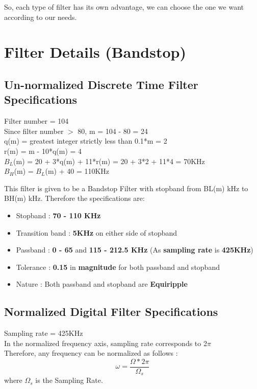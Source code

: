 \documentclass{article}
\begin{document}
So, each type of filter has its own advantage, we can choose the one we want according to our needs.

\clearpage

\section{Filter Details (Bandstop)}
\subsection{Un-normalized Discrete Time Filter Specifications}

Filter number = 104\\
Since filter number $>$ 80, m = 104 - 80 = 24\\
q(m) = greatest integer strictly less than 0.1*m = 2\\
r(m) = m - 10*q(m) = 4\\
$B_L$(m) = 20 + 3*q(m) + 11*r(m) = 20 + 3*2 + 11*4 = 70KHz \\
$B_H$(m) = $B_L$(m) + 40 = 110KHz\\

\vspace{1.5em}
\noindent

This filter is given to be a Bandstop Filter with stopband from BL(m) kHz to BH(m) kHz.
Therefore the specifications are:
\begin{itemize}
    \item Stopband : \textbf{70 - 110 KHz}
    \item  Transition band : \textbf{5KHz} on either side of stopband
    \item Passband : \textbf{0 - 65} and \textbf{115 - 212.5 KHz} (As \textbf{sampling rate} is \textbf{425KHz})

    \item  Tolerance : \textbf{0.15} in \textbf{magnitude} for both passband and stopband
    \item  Nature : Both passband and stopband are \textbf{Equiripple}
\end{itemize}


\subsection{Normalized Digital Filter Specifications}
Sampling rate = 425KHz\\
In the normalized frequency axis, sampling rate corresponds to 2$\pi$\\
Therefore, any frequency can be normalized as follows :
\begin{equation*}
    \omega = \frac{\Omega*2\pi}{\Omega_s}
\end{equation*}
where $\Omega_s$ is the Sampling Rate.\\
\end{document}
